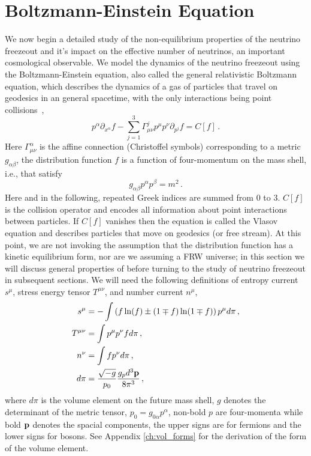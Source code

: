 \section{Boltzmann-Einstein Equation}
We now begin a detailed study of the non-equilibrium properties of the neutrino freezeout and it's impact on the effective number of neutrinos, an important cosmological observable. We model the dynamics of the neutrino freezeout using the Boltzmann-Einstein equation, also called the general relativistic Boltzmann equation, which describes the dynamics of a gas of particles that travel on geodesics in an general spacetime, with the only interactions being point collisions~\cite{andre,cercignani,bruhat,ehlers},
\begin{equation}\label{boltzmann_einstein}
p^\alpha\partial_{x^\alpha}f-\sum_{j=1}^3\Gamma^j_{\mu\nu}p^\mu p^\nu\partial_{p^j}f=C[f]\,.
\end{equation}
Here $ \Gamma^\alpha_{\mu\nu}$ is the affine connection (Christoffel symbols) corresponding to a metric $g_{\alpha\beta}$,   the distribution function $f$ is a function of four-momentum on the mass shell, i.e., that satisfy
 \begin{equation}
g_{\alpha\beta}p^\alpha p^\beta=m^2\,.
\end{equation}
Here and in the following,  repeated Greek indices are summed from $0$ to $3$.  $C[f]$ is the collision operator and encodes all information about point interactions between particles.  If $C[f]$ vanishes then the equation is called the Vlasov equation and describes particles that move on geodesics (or free stream).  At this point, we are  not invoking the assumption that the distribution function has a kinetic equilibrium form, nor are we assuming a FRW universe; in this section we will discuss  general properties of  before turning to the study of neutrino freezeout in subsequent sections.   We will need the following definitions of entropy current $s^\mu$, stress energy tensor ${T}^{\mu\nu}$, and number current $n^\mu$,
\begin{align}
\label{smdef} s^\mu&=-\int \left(f\ln(f)\pm(1\mp f)\ln(1\mp f)\right)p^\mu d\pi\,,\\
\label{Tmndef}{T}^{\mu\nu}&=\int p^\mu p^\nu f d\pi\,,\\
\label{nmdef} n^\nu&=\int f p^\nu d\pi\,,\\
d\pi&=\frac{\sqrt{-g}}{p_0}\frac{g_pd^3{\bf p}}{8\pi^3}\,,
\end{align}
where $d\pi$ is the volume element on the future mass shell, $g$ denotes the determinant of the metric tensor, $p_0=g_{0\alpha} p^\alpha$, non-bold $p$ are four-momenta while bold ${\bf p}$ denotes the spacial components, the upper signs are for fermions and the lower signs for bosons. See Appendix \ref{ch:vol_forms} for the derivation of the form of the volume element.
